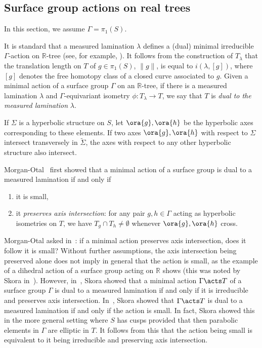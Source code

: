 \subsection{Surface group actions on real trees}

In this section, we assume $\Gamma = \pi_1(S)$.

It is standard that a measured lamination $\lambda$ defines a (dual) minimal irreducible $\Gamma$-action on $\mathbb{R}$-tree (see, for example, \cite[Chapter~11]{Kap09:HyperbolicManifold}).
It follows from the construction of $T_\lambda$ that the translation length on $T$ of $g \in \pi_1(S)$, $\| g \|$, is equal to $i(\lambda,[g])$, where $[g]$ denotes the free homotopy class of a closed curve associated to $g$.
Given a minimal action of a surface group $\Gamma$ on an $\mathbb{R}$-tree, if there is a measured lamination $\lambda$ and $\Gamma$-equivariant isometry $\phi \colon T_\lambda \to T$, we say that $T$ is \emph{dual to the measured lamination} $\lambda$.

If $\Sigma$ is a hyperbolic structure on $S$, let $\ora{g}, \ora{h}$ be the hyperbolic axes corresponding to these elements.
If two axes $\ora{g},\ora{h}$ with respect to $\Sigma$ intersect transversely in $\tilde{\Sigma}$, the axes with respect to any other hyperbolic structure also intersect. 

Morgan-Otal~\cite{MO93:RelativeGrowths} first showed that a minimal action of a surface group is dual to a measured lamination if and only if 
\begin{enumerate}
    \item it is small,
    \item it \emph{preserves axis intersection}: for any pair $g,h \in \Gamma$ acting as hyperbolic isometries on $T$, we have $T_g \cap T_h \neq \emptyset$ whenever $\ora{g}, \ora{h}$ cross.
\end{enumerate}

Morgan-Otal asked in~\cite{MO93:RelativeGrowths}: if a minimal action preserves axis intersection, does it follow it is small?
Without further assumptions, the axis intersection being preserved alone does not imply in general that the action is small, as the example of a dihedral action of a surface group acting on $\mathbb{R}$ shows (this was noted by Skora in~\cite[Section~4]{Sko90:GeometricAction}).
However, in~\cite{Sko90:GeometricAction}, Skora showed that a minimal action $\Gamma \acts T$ of a surface group $\Gamma$ is dual to a measured lamination if and only if it is irreducible and preserves axis intersection.
In~\cite{Sk96:Splittings},  Skora showed that $\Gamma \acts T$ is dual to a measured lamination if and only if the action is small. In fact, Skora showed this in the more general setting where $S$ has cusps provided that then parabolic elements in $\Gamma$ are elliptic in $T$.
It follows from this that the action being small is equivalent to it being irreducible and preserving axis intersection.

